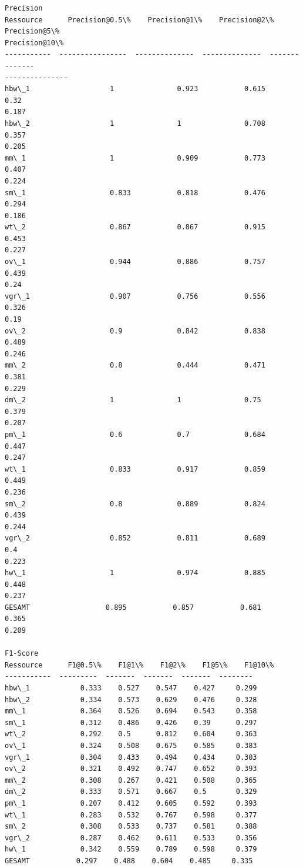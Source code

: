 \documentclass[11pt]{article}
\begin{document}
\begin{Verbatim}[commandchars=\\\{\}]
Precision
Ressource      Precision@0.5\%    Precision@1\%    Precision@2\%    Precision@5\%
Precision@10\%
-----------  ----------------  --------------  --------------  --------------
---------------
hbw\_1                   1               0.923           0.615           0.32
0.187
hbw\_2                   1               1               0.708           0.357
0.205
mm\_1                    1               0.909           0.773           0.407
0.224
sm\_1                    0.833           0.818           0.476           0.294
0.186
wt\_2                    0.867           0.867           0.915           0.453
0.227
ov\_1                    0.944           0.886           0.757           0.439
0.24
vgr\_1                   0.907           0.756           0.556           0.326
0.19
ov\_2                    0.9             0.842           0.838           0.489
0.246
mm\_2                    0.8             0.444           0.471           0.381
0.229
dm\_2                    1               1               0.75            0.379
0.207
pm\_1                    0.6             0.7             0.684           0.447
0.247
wt\_1                    0.833           0.917           0.859           0.449
0.236
sm\_2                    0.8             0.889           0.824           0.439
0.244
vgr\_2                   0.852           0.811           0.689           0.4
0.223
hw\_1                    1               0.974           0.885           0.448
0.237
GESAMT                  0.895           0.857           0.681           0.365
0.209

F1-Score
Ressource      F1@0.5\%    F1@1\%    F1@2\%    F1@5\%    F1@10\%
-----------  ---------  -------  -------  -------  --------
hbw\_1            0.333    0.527    0.547    0.427     0.299
hbw\_2            0.334    0.573    0.629    0.476     0.328
mm\_1             0.364    0.526    0.694    0.543     0.358
sm\_1             0.312    0.486    0.426    0.39      0.297
wt\_2             0.292    0.5      0.812    0.604     0.363
ov\_1             0.324    0.508    0.675    0.585     0.383
vgr\_1            0.304    0.433    0.494    0.434     0.303
ov\_2             0.321    0.492    0.747    0.652     0.393
mm\_2             0.308    0.267    0.421    0.508     0.365
dm\_2             0.333    0.571    0.667    0.5       0.329
pm\_1             0.207    0.412    0.605    0.592     0.393
wt\_1             0.283    0.532    0.767    0.598     0.377
sm\_2             0.308    0.533    0.737    0.581     0.388
vgr\_2            0.287    0.462    0.611    0.533     0.356
hw\_1             0.342    0.559    0.789    0.598     0.379
GESAMT           0.297    0.488    0.604    0.485     0.335
    \end{Verbatim}
\end{document}
